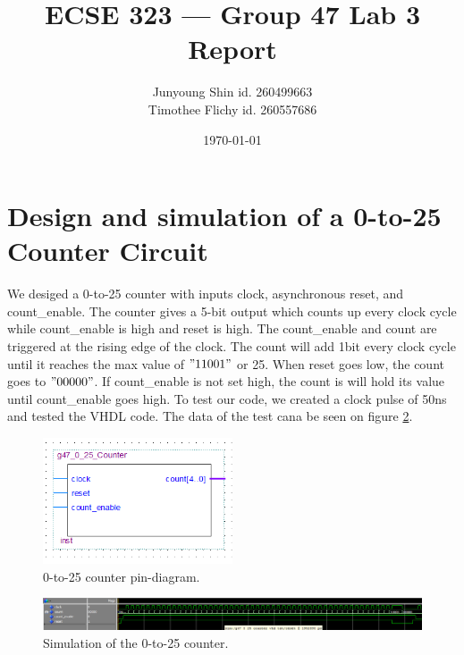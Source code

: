 \documentclass[10pt]{article}
\title{ECSE 323 --- Group 47 Lab 3 Report}
\author{Junyoung Shin id. 260499663\\ Timothee Flichy id. 260557686}
\date{\today}
\begin{document}
\maketitle
\section*{Design and simulation of a 0-to-25 Counter Circuit}
We desiged a 0-to-25 counter with inputs clock, asynchronous reset, and count\_enable. The counter gives a 5-bit output which counts up every clock cycle while count\_enable is high and reset is high. The count\_enable and count are triggered at the rising edge of the clock. The count will add 1bit every clock cycle until it reaches the max value of $"11001"$ or 25. When reset goes low, the count goes to $"00000"$. If count\_enable is not set high, the count is will hold its value until count\_enable goes high.
To test our code, we created a clock pulse of 50ns and tested the VHDL code. The data of the test cana be seen on figure \ref{fig:count_test}.
\begin{figure}[!htb]
    \centering
    \includegraphics[width=0.5\textwidth]{./counter_0to25.png}
    \caption{0-to-25 counter pin-diagram.}
    \label{fig:count_pin}
\end{figure}
\begin{figure}[!htb]
    \centering
    \includegraphics[width=1\textwidth]{./test_0to25.png}
    \caption{Simulation of the 0-to-25 counter.}
    \label{fig:count_test}
\end{figure}
\end{document}

